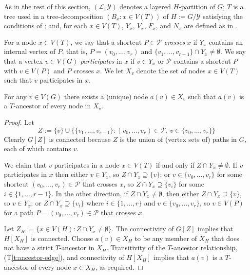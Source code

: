 \documentclass{patmorin}
\newcommand{\tref}[1]{(T\ref{t:#1})}
\begin{document}
As in the rest of this section, $(\mathcal{L},\mathcal{Y})$ denotes a layered $H$-partition of $G$; $T$ is a tree used in a tree-decomposition $(B_x:x\in V(T))$ of $H:=G/\mathcal{Y}$ satisfying the conditions of ; and, for each $x\in V(T)$, $Y_x$, $V_x$, $F_x$, and $N_x$ are defined as in .

For a node $x\in V(T)$, we say that a shortcut $P\in\mathcal{P}$ \emph{crosses} $x$ if $Y_x$ contains an internal vertex of $P$, that is, $P=(v_0,\ldots,v_r)$ and $\{v_1,\ldots,v_{r-1}\}\cap Y_x\neq\emptyset$.  We say that a vertex $v\in V(G)$ \emph{participates} in $x$ if $v\in Y_x$ or $\mathcal{P}$ contains a shortcut $P$ with $v\in V(P)$ and $P$ crosses $x$. We let $X_v$ denote the set of nodes $x\in V(T)$ such that $v$ participates in $x$.

\begin{clm}
  For any $v\in V(G)$ there exists a (unique) node $a(v)\in X_v$ such that
  $a(v)$ is a $T$-ancestor of every node in $X_v$.
\end{clm}

\begin{proof}
  Let 
  \[
     Z := \{v\} \cup \{\{v_1,\ldots,v_{r-1}\}:\mbox{$(v_0,\ldots,v_r)\in\mathcal{P}$, $v\in \{v_0,\ldots,v_r\}$}\}
  \]
  Clearly $G[Z]$ is connected because $Z$ is the union of (vertex sets of) paths in $G$, each of which contains $v$. 
  
  We claim that $v$ participates in a node $x\in V(T)$ if and only if $Z\cap Y_x\neq\emptyset$.  If $v$ participates in $x$ then either $v\in Y_x$, so $Z\cap Y_x\supseteq\{v\}$; or $v\in \{v_0,\ldots,v_r\}$ for some shortcut $(v_0,\ldots,v_r)\in\mathcal{P}$ that crosses $x$, so $Z\cap Y_x\supseteq \{v_i\}$ for some $i\in\{1,\ldots,r-1\}$.  In the other direction, if $Z\cap Y_x\neq\emptyset$, then either $Z\cap Y_x\supseteq \{v\}$, so $v\in Y_x$; or $Z\cap Y_x\supseteq \{v_i\}$ where $i\in\{1,\ldots,r\}$ and $v\in\{v_0,\ldots,v_r\}$, so $v\in V(P)$ for a path $P=(v_0,\ldots,v_r)\in\mathcal{P}$ that crosses $x$. 

  Let $Z_H:=\{x\in V(H): Z\cap Y_x\neq\emptyset\}$.  The connectivity of $G[Z]$ implies that $H[X_H]$ is connected.  
  Choose $a(v)\in X_H$ to be any member of $X_H$ that does not have a strict $T$-ancestor in $X_H$.  Transitivity of the $T$-ancestor relationship, \tref{ancestor-edge}, and connectivity of $H[X_H]$ implies that $a(v)$ is a $T$-ancestor of every node $x\in X_H$, as required.
\end{proof}
\end{document}
